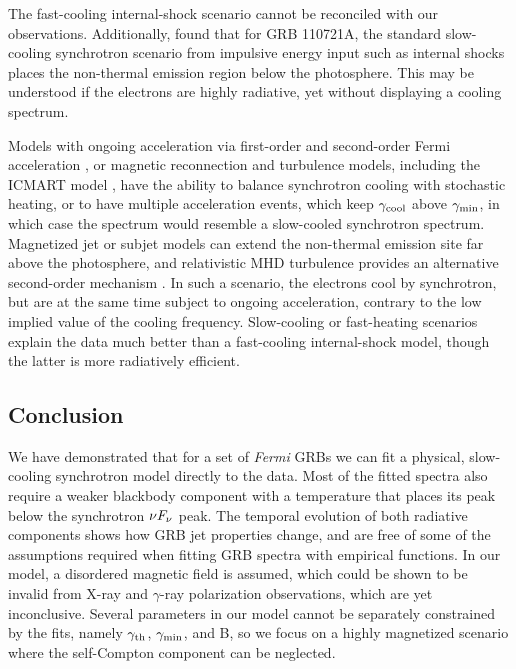 
The fast-cooling internal-shock scenario cannot be reconciled with our
observations. Additionally, \cite{Iyyani:2013} found that for GRB
110721A, the standard slow-cooling synchrotron scenario from impulsive
energy input such as internal shocks places the non-thermal emission
region below the photosphere. This may be understood if the electrons
are highly radiative, yet without displaying a cooling spectrum.


Models with ongoing acceleration via first-order and second-order
Fermi acceleration \cite{Waxman:1995,Dermer:2001}, or magnetic
reconnection and turbulence models, including the ICMART model
\cite{zhang:2011}, have the ability to balance synchrotron cooling
with stochastic heating, or to have multiple acceleration events,
which keep $\gamma_{\rm cool}$ above $\gamma_{\rm min}$, in which case the
spectrum would resemble a slow-cooled synchrotron spectrum.
Magnetized jet or subjet models \cite{Lazar:2009}
can extend the non-thermal emission site far above the photosphere, and 
relativistic MHD turbulence provides an alternative second-order mechanism
\cite{Lyutikov:2013}.
In such a scenario, the electrons cool by synchrotron, but are at the
same time subject to ongoing acceleration, contrary to the low implied
value of the cooling frequency. Slow-cooling or fast-heating scenarios
explain the data much better than a fast-cooling internal-shock model,
though the latter is more radiatively efficient.



\subsection{Conclusion}
We have demonstrated that for a set of {\it Fermi} GRBs we can fit a
physical, slow-cooling synchrotron model directly to the data. Most of
the fitted spectra also require a weaker blackbody component with a
temperature that places its peak below the synchrotron $\nu F_{\nu}$
peak. The temporal evolution of both radiative components shows how
GRB jet properties change, and are free of some of the assumptions
required when fitting GRB spectra with empirical functions. In our
model, a disordered magnetic field is assumed, which could be shown to
be invalid from X-ray and $\gamma$-ray polarization observations,
which are yet inconclusive.  Several parameters in our model cannot be
separately constrained by the fits, namely $\gamma_{\rm th}$, $\gamma_{\rm min}$, and
B, so we focus on a highly magnetized scenario where the self-Compton
component can be neglected.

